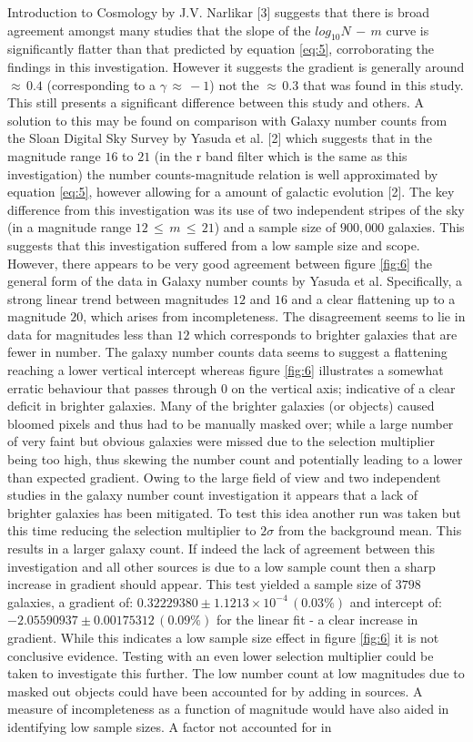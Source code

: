 \documentclass[journal]{IEEEtran}
\begin{document}
\noindent Introduction to Cosmology by J.V. Narlikar [3] suggests that there is broad agreement amongst many studies that the slope of the $log_{10}N\,-\,m$ curve is significantly flatter than that predicted by equation \ref{eq:5}, corroborating the findings in this investigation. However it suggests the gradient is generally around $\approx\,0.4$ (corresponding to a $\gamma\,\approx\,-1$) not the $\approx\,0.3$ that was found in this study. This still presents a significant difference between this study and others. A solution to this may be found on comparison with Galaxy number counts from the Sloan Digital Sky Survey by Yasuda et al. [2] which suggests that in the magnitude range $16$ to $21$ (in the r band filter which is the same as this investigation) the number counts-magnitude relation is well approximated by equation \ref{eq:5}, however allowing for a amount of galactic evolution [2]. The key difference from this investigation was its use of two independent stripes of the sky (in a magnitude range $12\,\leq\,m\,\leq\,21$) and a sample size of $900, 000$ galaxies. This suggests that this investigation suffered from a low sample size and scope. However, there appears to be very good agreement between figure \ref{fig:6} the general form of the data in Galaxy number counts by Yasuda et al. Specifically, a strong linear trend between magnitudes $12$ and $16$ and a clear flattening up to a magnitude $20$, which arises from incompleteness. The disagreement seems to lie in data for magnitudes less than $12$ which corresponds to brighter galaxies that are fewer in number. The galaxy number counts data seems to suggest a flattening reaching a lower vertical intercept whereas figure \ref{fig:6} illustrates a somewhat erratic behaviour that passes through $0$ on the vertical axis; indicative of a clear deficit in brighter galaxies. Many of the brighter galaxies (or objects) caused bloomed pixels and thus had to be manually masked over; while a large number of very faint but obvious galaxies were missed due to the selection multiplier being too high, thus skewing the number count and potentially leading to a lower than expected gradient. Owing to the large field of view and two independent studies in the galaxy number count investigation it appears that a lack of brighter galaxies has been mitigated. To test this idea another run was taken but this time reducing the selection multiplier to $2\sigma$ from the background mean. This results in a larger galaxy count. If indeed the lack of agreement between this investigation and all other sources is due to a low sample count then a sharp increase in gradient should appear. This test yielded a sample size of $3798$ galaxies, a gradient of: $0.32229380 \pm 1.1213\times10^{-4} \,(0.03\%)$ and intercept of:$-2.05590937 \pm 0.00175312\,(0.09\%)$ for the linear fit - a clear increase in gradient. While this indicates a low sample size effect in figure \ref{fig:6} it is not conclusive evidence. Testing with an even lower selection multiplier could be taken to investigate this further. The low number count at low magnitudes due to masked out objects could have been accounted for by adding in sources. A measure of incompleteness as a function of magnitude would have also aided in identifying low sample sizes. A factor not accounted for in 
\end{document}
